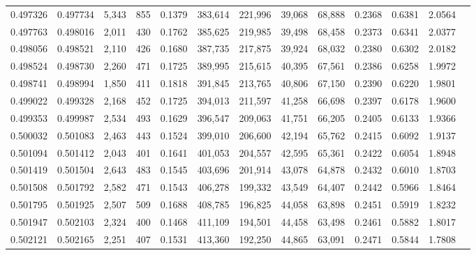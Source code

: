 \begin{tabular}{rrrrrrrrrrrrr}
0.497326 & 0.497734 &  5,343 &   855 &                                     0.1379 & 383,614 & 221,996 &  39,068 &  68,888 & 0.2368 & 0.6381 & 2.0564 \\
0.497763 & 0.498016 &  2,011 &   430 &                                     0.1762 & 385,625 & 219,985 &  39,498 &  68,458 & 0.2373 & 0.6341 & 2.0377 \\
0.498056 & 0.498521 &  2,110 &   426 &                                     0.1680 & 387,735 & 217,875 &  39,924 &  68,032 & 0.2380 & 0.6302 & 2.0182 \\
0.498524 & 0.498730 &  2,260 &   471 &                                     0.1725 & 389,995 & 215,615 &  40,395 &  67,561 & 0.2386 & 0.6258 & 1.9972 \\
0.498741 & 0.498994 &  1,850 &   411 &                                     0.1818 & 391,845 & 213,765 &  40,806 &  67,150 & 0.2390 & 0.6220 & 1.9801 \\
0.499022 & 0.499328 &  2,168 &   452 &                                     0.1725 & 394,013 & 211,597 &  41,258 &  66,698 & 0.2397 & 0.6178 & 1.9600 \\
0.499353 & 0.499987 &  2,534 &   493 &                                     0.1629 & 396,547 & 209,063 &  41,751 &  66,205 & 0.2405 & 0.6133 & 1.9366 \\
0.500032 & 0.501083 &  2,463 &   443 &                                     0.1524 & 399,010 & 206,600 &  42,194 &  65,762 & 0.2415 & 0.6092 & 1.9137 \\
0.501094 & 0.501412 &  2,043 &   401 &                                     0.1641 & 401,053 & 204,557 &  42,595 &  65,361 & 0.2422 & 0.6054 & 1.8948 \\
0.501419 & 0.501504 &  2,643 &   483 &                                     0.1545 & 403,696 & 201,914 &  43,078 &  64,878 & 0.2432 & 0.6010 & 1.8703 \\
0.501508 & 0.501792 &  2,582 &   471 &                                     0.1543 & 406,278 & 199,332 &  43,549 &  64,407 & 0.2442 & 0.5966 & 1.8464 \\
0.501795 & 0.501925 &  2,507 &   509 &                                     0.1688 & 408,785 & 196,825 &  44,058 &  63,898 & 0.2451 & 0.5919 & 1.8232 \\
0.501947 & 0.502103 &  2,324 &   400 &                                     0.1468 & 411,109 & 194,501 &  44,458 &  63,498 & 0.2461 & 0.5882 & 1.8017 \\
0.502121 & 0.502165 &  2,251 &   407 &                                     0.1531 & 413,360 & 192,250 &  44,865 &  63,091 & 0.2471 & 0.5844 & 1.7808 \\

\end{tabular}
